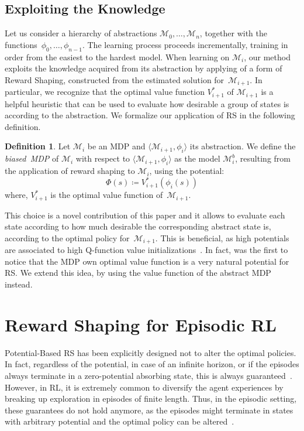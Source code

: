 \documentclass[letterpaper]{article} %
\theoremstyle{plain}
\theoremstyle{definition}
\newtheorem{definition}{Definition}
\theoremstyle{remark}
\newcommand{\SetSym}[1]{\mathcal{#1}}
\newcommand{\Model}{\SetSym{M}}
\newcommand{\Mapping}{\phi}
\newcommand{\Potential}{\Phi}
\newcommand{\Biased}[1]{#1^{b}}
\begin{document}
\subsection{Exploiting the Knowledge}
Let us consider a hierarchy of abstractions $\Model_0, \dots, \Model_n$, together with
the functions~$\Mapping_{0}, \dots, \Mapping_{n-1}$. The learning process proceeds
incrementally, training in order from the easiest to the hardest model.
When learning on $\Model_i$, our method exploits the knowledge acquired from its abstraction by applying of a form of Reward Shaping, constructed from the estimated solution for~$\Model_{i+1}$.
%
In particular, we recognize that the optimal value function $V^*_{i+1}$ of $\Model_{i+1}$ is a
helpful heuristic that can be used to evaluate how desirable a group of states is according to the abstraction.
We formalize our application of RS in the following definition.
\begin{definition}
	Let $\Model_i$ be an MDP and $\langle \Model_{i+1}, \Mapping_i \rangle$ its abstraction.
	We define the \emph{biased~MDP} of $\Model_i$ with respect to $\langle \Model_{i+1}, \Mapping_i \rangle$
	as the model $\Biased\Model_i$, resulting
	from the application of reward shaping to $\Model_i$, using the potential:
	\begin{equation}
		\Potential(s) \coloneqq V_{i+1}^*(\Mapping_i(s))
		\label{eq:shaping-potential}
	\end{equation}
	where, $V_{i+1}^*$ is the optimal value function of~$\Model_{i+1}$.
	\label{def:biased-mdp}
\end{definition}

This choice is a novel contribution of this paper and it allows to evaluate each state
according to how much desirable the corresponding abstract state is, according to the optimal policy for~$\Model_{i+1}$.
This is beneficial, as high potentials are associated to high Q-function value initializations~\cite{wiewiora2003potential}.
In fact, \cite{ng1999policy} was the first to notice that the MDP own optimal value function is a very natural potential for RS.
We extend this idea, by using the value function of the abstract MDP instead.


\section{Reward Shaping for Episodic RL}
\label{sec:shaping-episodes}

Potential-Based RS has been explicitly designed not to alter the optimal
policies. In fact, regardless of the potential, in case of an infinite horizon, or
if the episodes always terminate in a zero-potential absorbing state, this is always
guaranteed~\cite{ng1999policy}.  However, in RL, it is extremely common to diversify the agent experiences by
breaking up exploration in episodes of finite length. Thus, in the episodic
setting, these guarantees do not hold anymore, as the episodes might terminate
in states with arbitrary potential and the optimal policy can be altered~\cite{grzes2017reward}.
\end{document}
